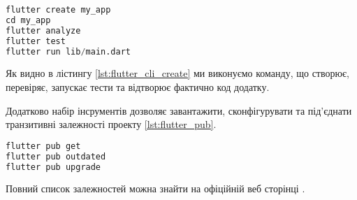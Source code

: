 \begin{lstlisting}[style=light, language=Python,label={lst:flutter_cli_create},caption=Flutter Create Project]
flutter create my_app
cd my_app
flutter analyze
flutter test
flutter run lib/main.dart
\end{lstlisting}

Як видно в лістингу \ref{lst:flutter_cli_create} ми виконуємо команду, що створює, перевіряє, запускає тести та відтворює фактично код додатку.

Додатково набір інсрументів дозволяє завантажити, сконфігурувати та під'єднати транзитивні залежності проекту \ref{lst:flutter_pub}.
\begin{lstlisting}[style=light, language=Python,label={lst:flutter_pub},caption=Flutter Dependency Resolution]
flutter pub get
flutter pub outdated
flutter pub upgrade
\end{lstlisting}

Повний список залежностей можна знайти на офіційній веб сторінці \cite{flutter_cli}.
